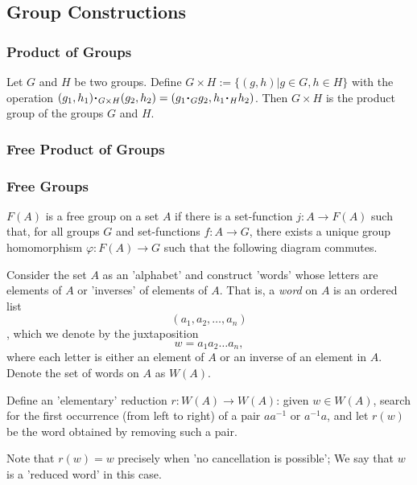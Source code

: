 \subsection{Group Constructions}\label{groupconstructions}

\subsubsection{Product of Groups}\label{groupproduct}
Let $G$ and $H$ be two groups. Define $G \times H := \{ (g,h) | g \in G, h \in H \}$ with the operation
$(g_1,h_1) \LargerCdot_{G \times H} (g_2,h_2) = (g_1 \LargerCdot_G g_2,h_1 \LargerCdot_H h_2)$. Then $G \times H$
is the product group of the groups $G$ and $H$.

\subsubsection{Free Product of Groups}\label{freegroupproduct}

\subsubsection{Free Groups}\label{freegroup}
$F(A)$ is a free group on a set $A$ if there is a set-function $j : A \rightarrow F(A)$ such that, for all groups $G$
and set-functions $f : A \rightarrow G$, there exists a unique group homomorphism $\varphi : F(A) \rightarrow G$ such that
the following diagram commutes.

\begin{figure}[H]
\centering

\end{figure}


Consider the set $A$ as an 'alphabet' and construct 'words' whose letters are elements of $A$ or 'inverses' of elements of $A$.
That is, a \emph{word} on $A$ is an ordered list
$$(a_1,a_2,\dots,a_n)$$,
which we denote by the juxtaposition
$$w = a_1a_2\dots a_n,$$
where each letter is either an element of $A$ or an inverse of an element in $A$. Denote the set of words on $A$ as $W(A)$.

Define an 'elementary' reduction $r : W(A) \rightarrow W(A)$: given $w \in W(A)$, search for the first occurrence (from left
to right) of a pair $aa^{-1}$ or $a^{-1}a$, and let $r(w)$ be the word obtained by removing such a pair.

Note that $r(w) = w$ precisely when 'no cancellation is possible'; We say that $w$ is a 'reduced word' in this case.

